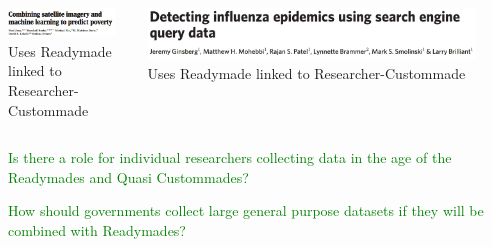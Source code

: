 \documentclass[aspectratio=169]{beamer}
\begin{document}
\begin{frame}

\begin{columns}

\begin{column}{0.5\textwidth}  
\begin{center}
\includegraphics[width=0.9\textwidth]{figures/jean_combining_2016_title}\\
Uses Readymade linked to Researcher-Custommade
\end{center}
\end{column}
\begin{column}{0.5\textwidth}
\begin{center}
\includegraphics[width=0.9\textwidth]{figures/ginsberg_detecting_2009_title}\\
Uses Readymade linked to Researcher-Custommade
\end{center}
\end{column}
\end{columns}

\end{frame}
\begin{frame}

\textcolor{green}{Is there a role for individual researchers collecting data in the age of the Readymades and Quasi Custommades?}

\end{frame}
\begin{frame}

\textcolor{green}{How should governments collect large general purpose datasets if they will be combined with Readymades?}

\end{frame}
\end{document}
